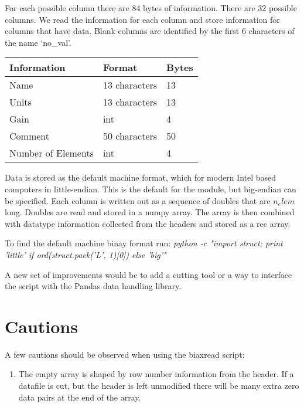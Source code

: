 \documentclass[a4paper,11pt,oneside]{article}
\begin{document}
For each possible column there are 84 bytes of information.  There are 32 possible columns.  We read the information for each column and store information for columns that have data.  Blank columns are identified by the first 6 characters of the name `no\_val'.  

\begin{table}[h]
	\begin{center}
	\begin{tabular}{| l | l | l |}
		\hline
                  \rowcolor[gray]{.85}
		Information & Format & Bytes\\
		\hline
		Name & 13 characters &  13\\
		\hline
		Units & 13 characters &  13 \\
		\hline
		Gain & int & 4\\
		\hline
		Comment & 50 characters & 50\\
		\hline
		Number of Elements & int & 4\\
		\hline
	\end{tabular}
	\end{center}
	\label{BinaryColHeadFormat}
\end{table}

Data is stored as the default machine format, which for modern Intel based computers in little-endian.  This is the default for the module, but big-endian can be specified.  Each column is written out as a sequence of doubles that are $n_elem$ long.  Doubles are read and stored in a numpy array.  The array is then combined with datatype information collected from the headers and stored as a rec array.

To find the default machine binay format run: \emph{python -c "import struct; print 'little' if ord(struct.pack('L', 1)[0]) else 'big'"}

A new set of improvements would be to add a cutting tool or a way to interface the script with the Pandas data handling library.

\section{Cautions}
A few cautions should be observed when using the biaxread script:

\begin{enumerate}
\item The empty array is shaped by row number information from the header.  If a datafile is cut, but the header is left unmodified there will be many extra zero data pairs at the end of the array.
\end{enumerate}
\end{document}
